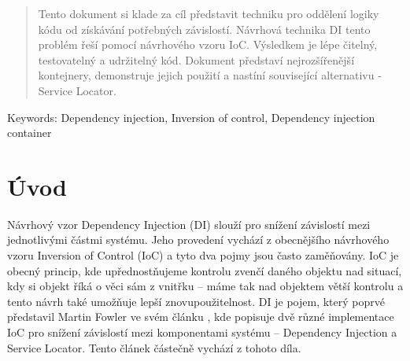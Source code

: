 \documentclass[a4paper,conference]{IEEEtran}
\begin{document}
\begin{abstract}
Tento dokument si klade za cíl představit techniku pro oddělení logiky kódu od získávání potřebných závislostí. Návrhová technika DI tento problém řeší pomocí návrhového vzoru IoC. Výsledkem je lépe čitelný, testovatelný a udržitelný kód. Dokument představí nejrozšířenější kontejnery, demonstruje jejich použití a nastíní související alternativu - Service Locator.
\end{abstract}











\begin{IEEEkeywords}
Keywords: Dependency injection, Inversion of control, Dependency injection container
\end{IEEEkeywords}


%
\IEEEpeerreviewmaketitle



\section{Úvod}
Návrhový vzor Dependency Injection (DI) slouží pro snížení závislostí mezi jednotlivými částmi systému. Jeho provedení vychází z obecnějšího návrhového vzoru Inversion of Control (IoC) a tyto dva pojmy jsou často zaměňovány.
IoC je obecný princip, kde upřednostňujeme kontrolu zvenčí daného objektu nad situací, kdy si objekt říká o věci sám z vnitřku – máme tak nad objektem větší kontrolu a tento návrh také umožňuje lepší znovupoužitelnost.
DI je pojem, který poprvé představil Martin Fowler ve svém článku \cite{Inversion of Control Containers and the Dependency Injection pattern}, kde popisuje dvě různé implementace IoC pro snížení závislostí mezi komponentami systému – Dependency Injection a Service Locator. Tento článek částečně vychází z tohoto díla.
\end{document}
